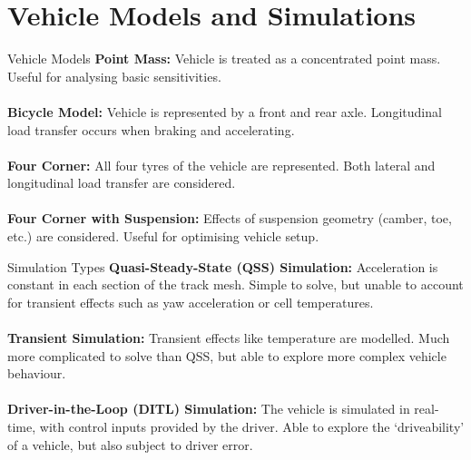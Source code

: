\section*{Vehicle Models and Simulations}

\begin{frame}{Vehicle Models}
    \textbf{Point Mass:}
    Vehicle is treated as a concentrated point mass.
    Useful for analysing basic sensitivities.
    \\~\\
    \textbf{Bicycle Model:}
    Vehicle is represented by a front and rear axle.
    Longitudinal load transfer occurs when braking and accelerating.
    \\~\\
    \textbf{Four Corner:}
    All four tyres of the vehicle are represented.
    Both lateral and longitudinal load transfer are considered.
    \\~\\
    \textbf{Four Corner with Suspension:}
    Effects of suspension geometry (camber, toe, etc.) are considered.
    Useful for optimising vehicle setup.
\end{frame}

\begin{frame}{Simulation Types}
    \textbf{Quasi-Steady-State (QSS) Simulation:}
    Acceleration is constant in each section of the track mesh.
    Simple to solve, but unable to account for transient effects
    such as yaw acceleration or cell temperatures.
    \\~\\
    \textbf{Transient Simulation:}
    Transient effects like temperature are modelled.
    Much more complicated to solve than QSS,
    but able to explore more complex vehicle behaviour.
    \\~\\
    \textbf{Driver-in-the-Loop (DITL) Simulation:}
    The vehicle is simulated in real-time,
    with control inputs provided by the driver.
    Able to explore the `driveability' of a vehicle,
    but also subject to driver error. 
\end{frame}

